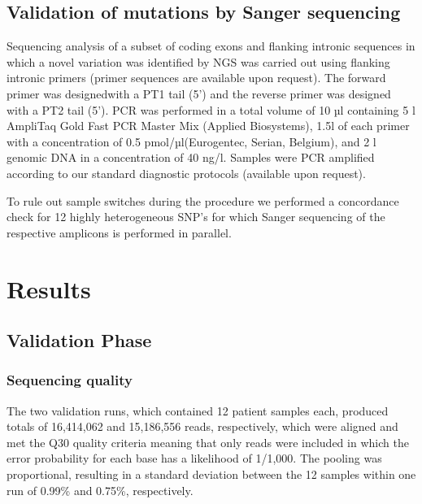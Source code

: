 \subsection{Validation of mutations by Sanger sequencing}
Sequencing analysis of a subset of coding exons and flanking intronic sequences in which a novel variation was identified by NGS was carried out using flanking intronic primers (primer sequences are available upon request). 
The forward primer was designedwith a PT1 tail (5') and the reverse primer was designed with a PT2 tail (5'). 
PCR was performed in a total volume of 10 µl containing 5 {\textmu}l AmpliTaq Gold {\textregistered}Fast PCR Master Mix (Applied Biosystems), 1.5{\textmu}l of each primer with a concentration of 0.5 pmol/µl(Eurogentec, Serian, Belgium), and 2 {\textmu}l genomic DNA in a concentration of 40 ng/{\textmu}l. 
Samples were PCR amplified according to our standard diagnostic protocols (available upon request). 

To rule out sample switches during the procedure we performed a concordance check for 12 highly heterogeneous SNP’s for which Sanger sequencing of the respective amplicons is performed in parallel.

\section{Results}\label{results}

\subsection{Validation Phase}

\subsubsection{Sequencing quality}
The two validation runs, which contained 12 patient samples each, produced totals of 16,414,062 and 15,186,556 reads, respectively, which were aligned and met the Q30 quality criteria meaning that only reads were included in which the error probability for each base has a likelihood of 1/1,000. 
The pooling was proportional, resulting in a standard deviation between the 12 samples within one run of 0.99\% and 0.75\%, respectively. 

